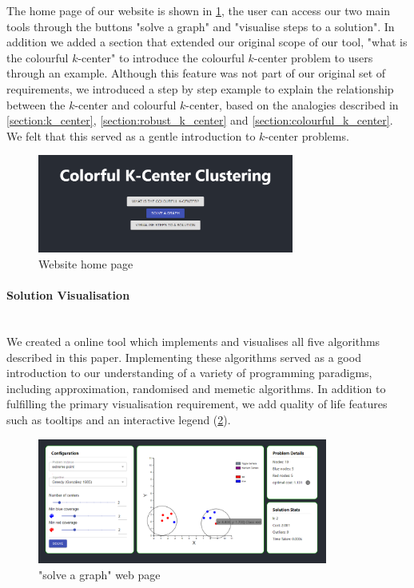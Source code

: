 The home page of our website is shown in \cref{fig:home_page}, the user can access our two main tools through the buttons "solve a graph" and "visualise steps to a solution". In addition we added a section that extended our original scope of our tool, "what is the colourful $k$-center" to introduce the colourful $k$-center problem to users through an example. Although this feature was not part of our original set of requirements, we introduced a step by step example to explain the relationship between the $k$-center and colourful $k$-center, based on the analogies described in \cref{section:k_center}, \cref{section:robust_k_center} and \cref{section:colourful_k_center}. We felt that this served as a gentle introduction to $k$-center problems.

\begin{figure}[H]
    \centering
    \includegraphics[width=0.75\textwidth]{images/home_page.png}
    \caption{Website home page}
    \label{fig:home_page}
\end{figure}

\paragraph{Solution Visualisation}~\\
We created a online tool which implements and visualises all five algorithms described in this paper. Implementing these algorithms served as a good introduction to our understanding of a variety of programming paradigms, including approximation, randomised and memetic algorithms. In addition to fulfilling the primary visualisation requirement, we add quality of life features such as tooltips and an interactive legend (\cref{fig:solve_app}).

\begin{figure}[H]
    \centering
    \includegraphics[width=0.85\textwidth]{images/solve_app.png}
    \caption{"solve a graph" web page}
    \label{fig:solve_app}
\end{figure}

